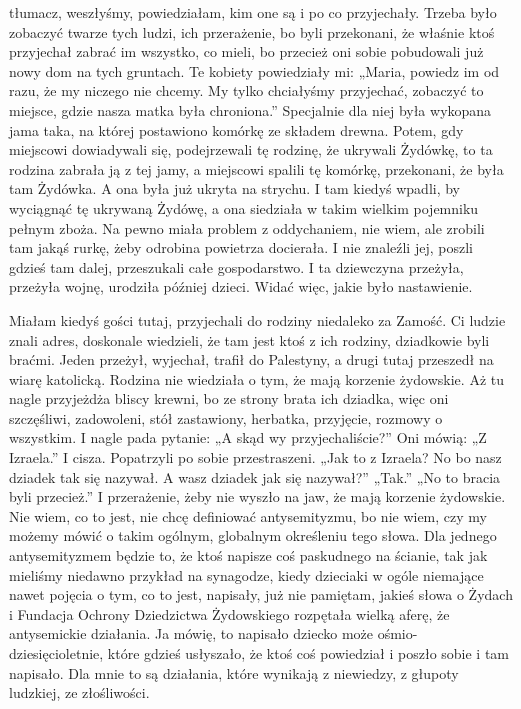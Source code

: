 {tłumacz, weszłyśmy, powiedziałam, kim one są i po co przyjechały. Trzeba było zobaczyć twarze tych ludzi, ich przerażenie, bo byli przekonani, że właśnie ktoś przyjechał zabrać im wszystko, co mieli, bo przecież oni sobie pobudowali już nowy dom na tych gruntach. Te kobiety powiedziały mi: „Maria, powiedz im od razu, że my niczego nie chcemy. My tylko chciałyśmy przyjechać, zobaczyć to miejsce, gdzie nasza matka była chroniona.” Specjalnie dla niej była wykopana jama taka, na której postawiono komórkę ze składem drewna. Potem, gdy miejscowi dowiadywali się, podejrzewali tę rodzinę, że ukrywali Żydówkę, to ta rodzina zabrała ją z tej jamy, a miejscowi spalili tę komórkę, przekonani, że była tam Żydówka. A ona była już ukryta na strychu. I tam kiedyś wpadli, by wyciągnąć tę ukrywaną Żydówę, a ona siedziała w takim wielkim pojemniku pełnym zboża. Na pewno miała problem z oddychaniem, nie wiem, ale zrobili tam jakąś rurkę, żeby odrobina powietrza docierała. I nie znaleźli jej, poszli gdzieś tam dalej, przeszukali całe gospodarstwo. I ta dziewczyna przeżyła, przeżyła wojnę, urodziła później dzieci. Widać więc, jakie było nastawienie.  

Miałam kiedyś gości tutaj, przyjechali do rodziny niedaleko za Zamość. Ci ludzie znali adres, doskonale wiedzieli, że tam jest ktoś z ich rodziny, dziadkowie byli braćmi. Jeden przeżył, wyjechał, trafił do Palestyny, a drugi tutaj przeszedł na wiarę katolicką. Rodzina nie wiedziała o tym, że mają korzenie żydowskie. Aż tu nagle przyjeżdża bliscy krewni, bo ze strony brata ich dziadka, więc oni szczęśliwi, zadowoleni, stół zastawiony, herbatka, przyjęcie, rozmowy o wszystkim. I nagle pada pytanie: „A skąd wy przyjechaliście?” Oni mówią: „Z Izraela.” I cisza. Popatrzyli po sobie przestraszeni. „Jak to z Izraela? No bo nasz dziadek tak się nazywał. A wasz dziadek jak się nazywał?” „Tak.” „No to bracia byli przecież.” I przerażenie, żeby nie wyszło na jaw, że mają korzenie żydowskie. Nie wiem, co to jest, nie chcę definiować antysemityzmu, bo nie wiem, czy my możemy mówić o takim ogólnym, globalnym określeniu tego słowa. Dla jednego antysemityzmem będzie to, że ktoś napisze coś paskudnego na ścianie, tak jak mieliśmy niedawno przykład na synagodze, kiedy dzieciaki w ogóle niemające nawet pojęcia o tym, co to jest, napisały, już nie pamiętam, jakieś słowa o Żydach i Fundacja Ochrony Dziedzictwa Żydowskiego rozpętała wielką aferę, że antysemickie działania. Ja mówię, to napisało dziecko może ośmio- dziesięcioletnie, które gdzieś usłyszało, że ktoś coś powiedział i poszło sobie i tam napisało. Dla mnie to są działania, które wynikają z niewiedzy, z głupoty ludzkiej, ze złośliwości. 

}
